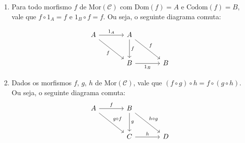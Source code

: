 \begin{defi}[Categorias]
\begin{enumerate}
\item Para todo morfismo $f$ de $\text{Mor}(\mathcal{C})$ com $\text{Dom}(f) = A$ e $\text{Codom}(f) = B$, vale que $f \circ 1_A = f$ e $1_B \circ f = f$. Ou seja, o seguinte diagrama comuta:

\[\begin{tikzcd}[sep=large]
	A & A \\
	& B & B
	\arrow["{1_A}", from=1-1, to=1-2]
	\arrow["f"', from=1-1, to=2-2]
	\arrow["f", from=1-2, to=2-2]
	\arrow["f", from=1-2, to=2-3]
	\arrow["{1_B}"', from=2-2, to=2-3]
\end{tikzcd}\]
\item Dados os morfismos $f$, $g$, $h$ de $\text{Mor}(\mathcal{C})$, vale que 
$(f \circ g) \circ h = f \circ (g \circ h)$. Ou seja, o seguinte diagrama comuta:
\[\begin{tikzcd}[sep=large]
	A & B \\
	& C & D
	\arrow["f", from=1-1, to=1-2]
	\arrow["{g \circ f}", from=1-1, to=2-2]
	\arrow["g", from=1-2, to=2-2]
	\arrow["{h \circ g}", from=1-2, to=2-3]
	\arrow["h", from=2-2, to=2-3]
\end{tikzcd}\]
\end{enumerate}
\end{defi}



